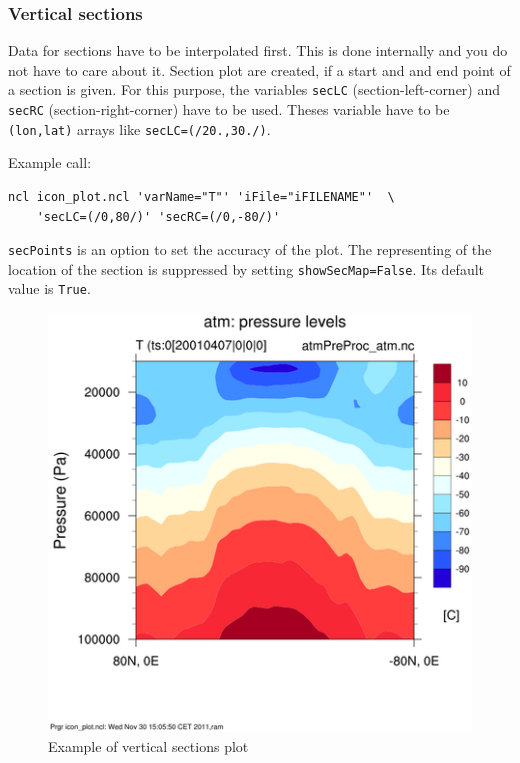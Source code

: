 \subsubsection{Vertical sections}
Data for sections have to be interpolated first. This is done internally and you do not have to care about it. Section plot are created, if a start and and end point of a section is given. For this purpose, the variables {\tt secLC} (section-left-corner) and {\tt secRC} (section-right-corner) have to be used. Theses variable have to be {\tt (lon,lat)} arrays like {\tt secLC=(/20.,30./)}.

Example call:

\begin{small}
\begin{verbatim}
ncl icon_plot.ncl 'varName="T"' 'iFile="iFILENAME"'  \
    'secLC=(/0,80/)' 'secRC=(/0,-80/)'
\end{verbatim}
\end{small}

{\tt secPoints} is an option to set the accuracy of the plot. The representing of the location of the section is suppressed by setting {\tt showSecMap=False}. Its default value is {\tt True}.

\begin{figure}[h!]%
\centering
\includegraphics[width=0.95\linewidth]{pictures/vertsection_plot.png}
\caption{Example of vertical sections plot}\label{fig:vertsections-plot}
\end{figure}

